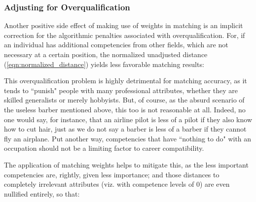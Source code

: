 \documentclass{article}
\begin{document}
\subsubsection{Adjusting for Overqualification}
Another positive side effect of making use of weights in matching is an implicit correction for the algorithmic penalties associated with overqualification. For, if an individual has additional competencies from other fields, which are not necessary at a certain position, the normalized unadjusted distance (\ref{eqn:normalized_distance}) yields less favorable matching results:
\EqnDistanceDerivative

This overqualification problem is highly detrimental for matching accuracy, as it tends to ``punish" people with many professional attributes, whether they are skilled generalists or merely hobbyists. But, of course, as the absurd scenario of the useless barber mentioned above, this too is not reasonable at all. Indeed, no one would say, for instance, that an airline pilot is less of a pilot if they also know how to cut hair, just as we do not say a barber is less of a barber if they cannot fly an airplane. Put another way, competencies that have ``nothing to do" with an occupation should not be a limiting factor to career compatibility.

The application of matching weights helps to mitigate this, as the less important competencies are, rightly, given less importance; and those distances to completely irrelevant attributes (viz. with competence levels of 0) are even nullified entirely, so that:
\EqnUnweightedWeightedDistances
\end{document}
